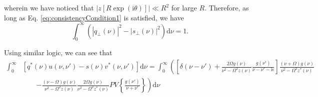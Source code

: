 wherein we have noticed that $|z[R\exp(\mathrm{i}\theta)]|\ll R^2$ for large $R$. Therefore, as long as Eq. \eqref{eq:consistencyCondition1} is satisfied, we have
\begin{equation}
\int_{0}^\infty\left(|q_\perp(\nu)|^2 - |s_\perp(\nu)|^2\right)\mathrm{d}\nu = 1.
\end{equation}

Using similar logic, we can see that
\begin{equation}\label{eq:qu-minus-sv-integral}
\begin{split}
\int_0^\infty&\left[q^*(\nu)u(\nu,\nu') - s(\nu)v^*(\nu,\nu')\right]\mathrm{d}\nu = \int_0^\infty\left(\left[\delta(\nu - \nu') + \frac{2\Omega g(\nu)}{\nu^2 - \Omega^2z(\nu)}\frac{g(\nu')}{\nu - \nu' - \mathrm{i}\epsilon}\right]\frac{(\nu + \Omega)g(\nu)}{\nu^2 - \Omega^2z^*(\nu)}\right.\\
&\qquad\left. - \frac{(\nu - \Omega)g(\nu)}{\nu^2 - \Omega^2z(\nu)}\frac{2\Omega g(\nu)}{\nu^2 - \Omega^2z^*(\nu)}PV\left\{\frac{g(\nu')}{\nu + \nu'}\right\}\right)\mathrm{d}\nu\\[0.5em]

\end{split}
\end{equation}
